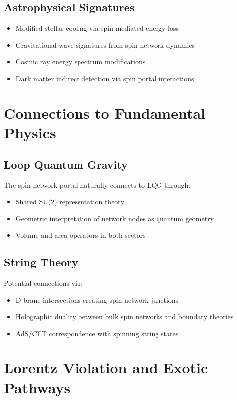 \documentclass{article}
\begin{document}
\subsection{Astrophysical Signatures}

\begin{itemize}
\item Modified stellar cooling via spin-mediated energy loss
\item Gravitational wave signatures from spin network dynamics
\item Cosmic ray energy spectrum modifications
\item Dark matter indirect detection via spin portal interactions
\end{itemize}

\section{Connections to Fundamental Physics}

\subsection{Loop Quantum Gravity}

The spin network portal naturally connects to LQG through:
\begin{itemize}
\item Shared SU(2) representation theory
\item Geometric interpretation of network nodes as quantum geometry
\item Volume and area operators in both sectors
\end{itemize}

\subsection{String Theory}

Potential connections via:
\begin{itemize}
\item D-brane intersections creating spin network junctions
\item Holographic duality between bulk spin networks and boundary theories
\item AdS/CFT correspondence with spinning string states
\end{itemize}

\section{Lorentz Violation and Exotic Pathways}
\end{document}
